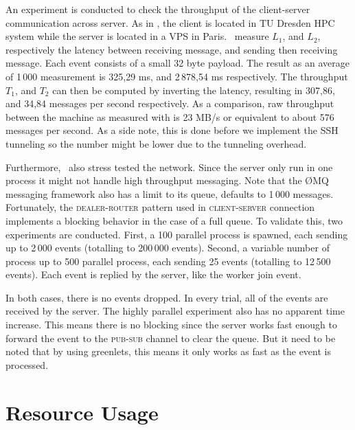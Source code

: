 An experiment is conducted to check the throughput of the client-server communication across server.
As in , the client is located in TU Dresden HPC system while the server is located in a VPS in Paris.
\First~measure \(L_1\), and \(L_2\), respectively the latency between receiving message, and sending then receiving message.
Each event consists of a small 32 byte payload.
The result as an average of 1\,000 measurement is 325,29 ms, and 2\,878,54 ms respectively.
The throughput \(T_1\), and \(T_2\) can then be computed by inverting the latency, resulting in 307,86, and 34,84 messages per second respectively.
As a comparison, raw throughput between the machine as measured with  is 23 MB/s or equivalent to about 576 messages per second.
As a side note, this is done before we implement the SSH tunneling so the number might be lower due to the tunneling overhead.

Furthermore, \first~also stress tested the network.
Since the server only run in one process it might not handle high throughput messaging.
Note that the \O MQ messaging framework also has a limit to its queue, defaults to 1\,000 messages.
Fortunately, the \textsc{dealer-router} pattern used in \textsc{client-server} connection implements a blocking behavior in the case of a full queue.
To validate this, two experiments are conducted.
First, a 100 parallel process is spawned, each sending up to 2\,000 events (totalling to 200\,000 events).
Second, a variable number of process up to 500 parallel process, each sending 25 events (totalling to 12\,500 events).
Each event is replied by the server, like the worker join event.

In both cases, there is no events dropped.
In every trial, all of the events are received by the server.
The highly parallel experiment also has no apparent time increase.
This means there is no blocking since the server works fast enough to forward the event to the \textsc{pub}-\textsc{sub} channel to clear the queue.
But it need to be noted that by using greenlets, this means it only works as fast as the event is processed.


\section{Resource Usage}
\label{sec:eval.resource}


